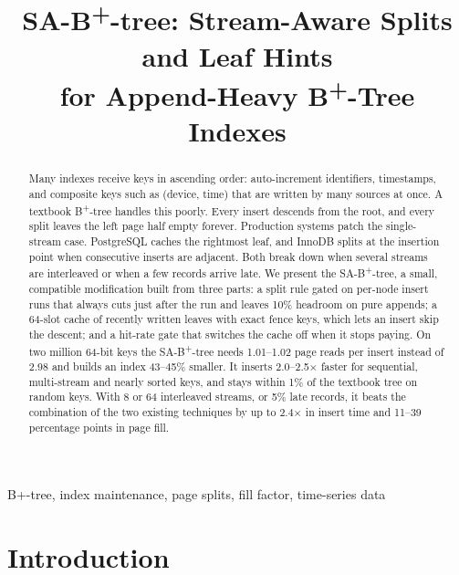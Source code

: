 \documentclass[conference]{IEEEtran}
\newcommand{\sab}{SA-B\textsuperscript{+}-tree}
\newcommand{\bp}{B\textsuperscript{+}-tree}
\begin{document}
\title{\sab: Stream-Aware Splits and Leaf Hints\\for Append-Heavy B\textsuperscript{+}-Tree Indexes}

\author{
}

\maketitle

\begin{abstract}
Many indexes receive keys in ascending order: auto-increment identifiers,
timestamps, and composite keys such as (device, time) that are written by many
sources at once. A textbook \bp{} handles this poorly. Every insert descends
from the root, and every split leaves the left page half empty forever.
Production systems patch the single-stream case. PostgreSQL caches the
rightmost leaf, and InnoDB splits at the insertion point when consecutive
inserts are adjacent. Both break down when several streams are interleaved or
when a few records arrive late. We present the \sab, a small, compatible
modification built from three parts: a split rule gated on per-node insert
runs that always cuts just after the run and leaves 10\% headroom on pure
appends; a 64-slot cache of recently written leaves with exact fence keys,
which lets an insert skip the descent; and a hit-rate gate that switches the
cache off when it stops paying. On two million 64-bit keys the \sab{} needs
1.01--1.02 page reads per insert instead of 2.98 and builds an index 43--45\%
smaller. It inserts 2.0--2.5$\times$ faster for sequential, multi-stream and
nearly sorted keys, and stays within 1\% of the textbook tree on random keys.
With 8 or 64 interleaved streams, or 5\% late records, it beats the
combination of the two existing techniques by up to 2.4$\times$ in insert time
and 11--39 percentage points in page fill.
\end{abstract}

\begin{IEEEkeywords}
B+-tree, index maintenance, page splits, fill factor, time-series data
\end{IEEEkeywords}

\section{Introduction}
\end{document}
